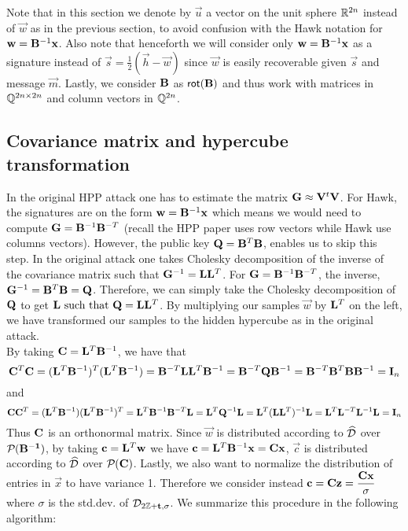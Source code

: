 Note that in this section we denote by $\vec{u}$ a vector on the unit sphere $\mathbb{R}^{2n}$ instead of $\vec{w}$ as in the previous section, to avoid confusion with the Hawk notation for $\mathbf{w} = \mathbf{B}^{-1} \mathbf{x}$.
Also note that henceforth we will consider only $\mathbf{w} = \mathbf{B}^{-1} \mathbf{x}$ as a signature instead of $\vec{s} = \frac{1}{2}(\vec{h} - \vec{w})$ since $\vec{w}$ is easily recoverable given $\vec{s}$ and message $\vec{m}$.
Lastly, we consider $\mathbf{B}$ as $\mathsf{rot}(\mathbf{B})$ and thus work with matrices in $\mathbb{Q}^{2n \times 2n}$ and column vectors in $\mathbb{Q}^{2n}$.

\subsection{Covariance matrix and hypercube transformation}
In the original HPP attack one has to estimate the matrix $\mathbf{G} \approx \mathbf{V} ^t \mathbf{V}$.
For Hawk, the signatures are on the form $\mathbf{w} = \mathbf{B}^{-1} \mathbf{x}$ which means we would need to compute $\mathbf{G} = \mathbf{B}^{-1} \mathbf{B}^{-T}$ 
(recall the HPP paper uses row vectors while Hawk use columns vectors).
However, the public key $\mathbf{Q} = \mathbf{B}^T \mathbf{B}$, enables us to skip this step.
In the original attack one takes Cholesky decomposition of the inverse of the covariance matrix such that $\mathbf{G}^{-1} = \mathbf{L}\mathbf{L}^T$. 
For $\mathbf{G} = \mathbf{B}^{-1} \mathbf{B}^{-T}$, the inverse,
$\mathbf{G}^{-1} = \mathbf{B}^T \mathbf{B} = \mathbf{Q}$. Therefore, we can simply take the Cholesky decomposition of $\mathbf{Q}$ to get $\mathbf{L} \text{ such that } \mathbf{Q} = \mathbf{L} \mathbf{L}^T$.
By multiplying our samples $\vec{w}$ by $\mathbf{L}^T$ on the left, we have transformed our samples to the hidden hypercube as in the original attack. \\
By taking $\mathbf{C} =  \mathbf{L}^T\mathbf{B}^{-1}$, we have that 
\[\mathbf{C}^T \mathbf{C} = (\mathbf{L}^T \mathbf{B}^{-1})^T (\mathbf{L}^T \mathbf{B}^{-1}) = \mathbf{B}^{-T} \mathbf{L} \mathbf{L}^T \mathbf{B}^{-1} = \mathbf{B}^{-T} \mathbf{Q} \mathbf{B}^{-1} = \mathbf{B}^{-T} \mathbf{B}^{T} \mathbf{B} \mathbf{B}^{-1} = \mathbf{I}_n\]
and
\[\mathbf{C}\mathbf{C}^T = (\mathbf{L}^T \mathbf{B}^{-1})(\mathbf{L}^T \mathbf{B}^{-1})^T = \mathbf{L}^T \mathbf{B}^{-1} \mathbf{B}^{-T} \mathbf{L} =  \mathbf{L}^T \mathbf{Q}^{-1} \mathbf{L} = \mathbf{L}^T (\mathbf{L} \mathbf{L}^T)^{-1} \mathbf{L} = \mathbf{L}^T \mathbf{L}^{-T} \mathbf{L}^{-1} \mathbf{L} = \mathbf{I}_n\]
Thus $\mathbf{C}$ is an orthonormal matrix.
Since $\vec{w}$ is distributed according to $\widehat{\mathcal{D}}$ over $\mathcal{P}_{}(\mathbf{\mathbf{B}^{-1}})$, by taking 
$\mathbf{c} = \mathbf{L}^{T} \mathbf{w}$ we have $\mathbf{c} = \mathbf{L}^{T} \mathbf{B}^{-1} \mathbf{x} = \mathbf{C} \mathbf{x}$, $\vec{c}$ is distributed according to $\widehat{\mathcal{D}}$ over $\mathcal{P}_{}(\mathbf{C})$.
Lastly, we also want to normalize the distribution of entries in $\vec{x}$ to have variance 1. Therefore we consider instead
$\vec{c} = \mat{C} \vec{z} = \mathlarger{\frac{\mat{C}\vec{x}}{\sigma}}$ where $\sigma$ is the std.dev. of $\mathcal{D}_{2\mathbb{Z} + \mathbf{t}, \sigma}$.
We summarize this procedure in the following algorithm:

